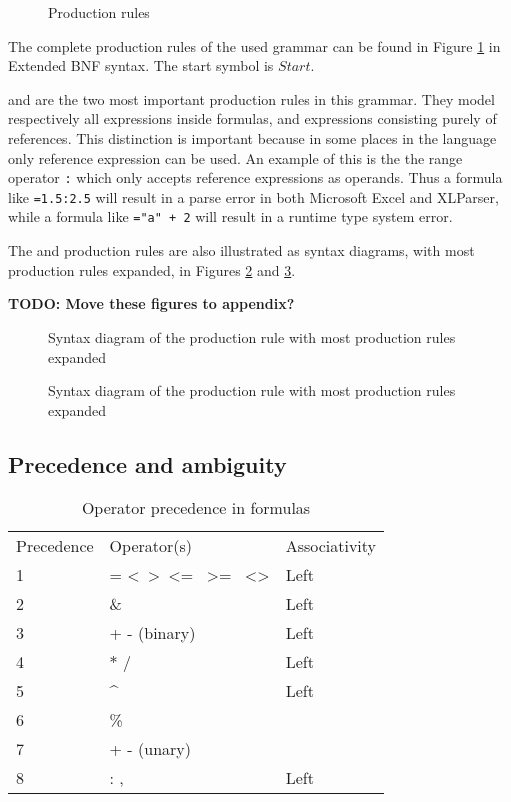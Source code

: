 \documentclass[12pt,a4paper,onecolumn,oneside]{memoir}
\newcommand{\todo}[1]{\textbf{TODO: #1}}
\newcommand{\f}[1]{\texttt{#1}}
\begin{document}
\begin{figure}
\small
\caption{Production rules}
\label{figure:productions}
\begin{multicols*}{2}

\end{multicols*}
\end{figure}

The complete production rules of the used grammar can be found in Figure \ref{figure:productions} in Extended BNF syntax.
The start symbol is $Start$.

 and  are the two most important production rules in this grammar.
They model respectively all expressions inside formulas, and expressions consisting purely of references.
This distinction is important because in some places in the language only reference expression can be used.
An example of this is the the range operator \f{:} which only accepts reference expressions as operands.
Thus a formula like \f{=1.5:2.5} will result in a parse error in both Microsoft Excel and XLParser, while a formula like \f{="a" + 2} will result in a runtime type system error.

The  and  production rules are also illustrated as syntax diagrams, with most production rules expanded, in Figures \ref{figure:Formula} and \ref{figure:Reference}.

\todo{Move these figures to appendix?}

\begin{figure}
	\caption{Syntax diagram of the  production rule with most production rules expanded}
	\label{figure:Formula}
	
\end{figure}

\begin{figure}
	\caption{Syntax diagram of the  production rule with most production rules expanded}
	\label{figure:Reference}
	
\end{figure}

\subsection{Precedence and ambiguity}

\begin{table}
\small
\caption{Operator precedence in formulas}
\label{table:operatorprec}
\begin{tabular}{lll}
Precedence & Operator(s) & Associativity \\
1 & = \textless \  \textgreater \  \textless= \  \textgreater= \  \textless\textgreater & Left         \\
2 & \& & Left \\
3 & + - (binary) & Left \\
4 & $\ast$ / & Left \\
5 & \textasciicircum & Left\footnotemark \\
6 & \% & \\
7 & + - (unary) & \\
8 & : , \texttt{\char32} & Left
\end{tabular}
\end{table}
\end{document}

